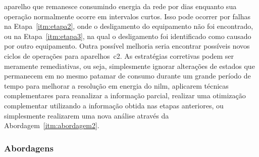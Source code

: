 \begin{enumerate}[label={Etapa} \arabic* - ,ref=\arabic*,align=left]
aparelho que remanesce consumindo energia da rede por dias enquanto
sua operação normalmente ocorre em intervalos curtos. Isso pode
ocorrer por falhas na Etapa~\ref{itm:etapa2}, onde o desligamento do
equipamento não foi encontrado, ou na Etapa~\ref{itm:etapa3}, na qual
o desligamento foi identificado como causado por outro equipamento.
Outra possível melhoria seria encontrar possíveis novos ciclos de
operações para aparelhos~\gls{c2}. As estratégias corretivas podem ser
meramente remediativas, ou seja, simplesmente ignorar alterações de
estados que permanecem em no mesmo patamar de consumo durante um grande
período de tempo para melhorar a resolução em energia do \gls{nilm},
aplicarem técnicas complementares para reanalizar a informação
parcial, realizar uma otimização complementar utilizando a informação
obtida nas etapas anteriores, ou simplesmente realizarem uma nova
análise através da Abordagem~\ref{itm:abordagem2}.
\end{enumerate}

\subsubsection[Abordagens]{Abordagens \cite[com
adaptações]{nilm_liang_pt1_2010_34,nilm_zeifman_review_2011}}
\label{top:abordagens}

